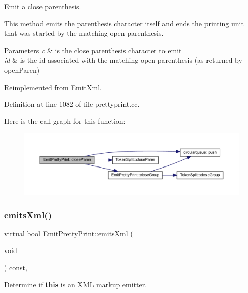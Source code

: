 Emit a close parenthesis. 

This method emits the parenthesis character itself and ends the printing unit that was started by the matching open parenthesis. 
\begin{DoxyParams}{Parameters}
{\em c} & is the close parenthesis character to emit \\
\hline
{\em id} & is the id associated with the matching open parenthesis (as returned by open\+Paren) \\
\hline
\end{DoxyParams}


Reimplemented from \mbox{\hyperlink{class_emit_xml_a3442a3f23a65cfcf073d57cf64733493}{Emit\+Xml}}.



Definition at line 1082 of file prettyprint.\+cc.

Here is the call graph for this function\+:
\nopagebreak
\begin{figure}[H]
\begin{center}
\leavevmode
\includegraphics[width=350pt]{class_emit_pretty_print_a83c6f5a16300b7b45526faf1f3c5c7de_cgraph}
\end{center}
\end{figure}
\mbox{\label{class_emit_pretty_print_a03f3c3650dc9ff7e4d472285d82569ee}} 
\subsubsection{\texorpdfstring{emitsXml()}{emitsXml()}}
{\footnotesize\ttfamily virtual bool Emit\+Pretty\+Print\+::emits\+Xml (\begin{DoxyParamCaption}\item[{void}]{ }\end{DoxyParamCaption}) const\hspace{0.3cm}{\ttfamily [inline]}, {\ttfamily [virtual]}}



Determine if {\bfseries{this}} is an X\+ML markup emitter. 

